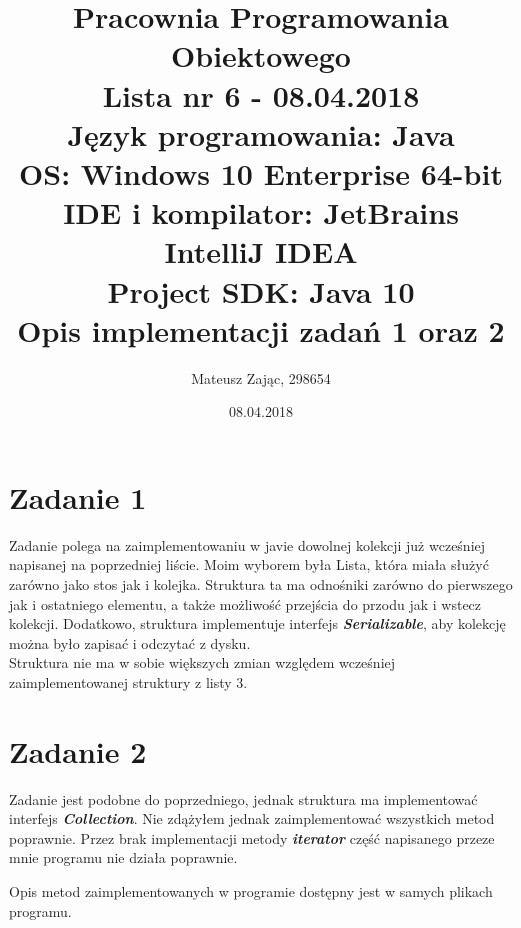 \documentclass[12pt]{article}
\begin{document}
\title{
\textbf{Pracownia Programowania Obiektowego\\}
\textbf{Lista nr 6 - 08.04.2018\\}
\textbf{Język programowania:} Java\\
\textbf{OS:} Windows 10 Enterprise 64-bit\\
\textbf{IDE i kompilator:} JetBrains IntelliJ IDEA\\
\textbf{Project SDK:} Java 10\\
Opis implementacji zadań 1 oraz 2
}

\author {Mateusz Zając, 298654}

\date {08.04.2018} 

\maketitle

\newpage

\section{Zadanie 1}

Zadanie polega na zaimplementowaniu w javie dowolnej kolekcji już wcześniej napisanej na poprzedniej liście.
Moim wyborem była Lista, która miała służyć zarówno jako stos jak i kolejka. Struktura ta ma odnośniki zarówno do pierwszego jak i ostatniego elementu, a także możliwość przejścia do przodu jak i wstecz kolekcji.
Dodatkowo, struktura implementuje interfejs \textbf{\textit{Serializable}}, aby kolekcję można było zapisać i odczytać z dysku. \\

Struktura nie ma w sobie większych zmian względem wcześniej zaimplementowanej struktury z listy 3. 

\newpage

\section{Zadanie 2}
	
Zadanie jest podobne do poprzedniego, jednak struktura ma implementować interfejs \textbf{\textit{Collection}}.
Nie zdążyłem jednak zaimplementować wszystkich metod poprawnie. Przez brak implementacji metody \textbf{\textit{iterator}} część napisanego przeze mnie programu nie działa poprawnie.

Opis metod zaimplementowanych w programie dostępny jest w samych plikach programu.
	 
\end{document}
